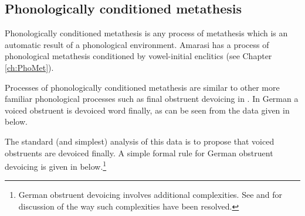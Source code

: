 \subsection{Phonologically conditioned metathesis}\label{sec:PhoMet}
Phonologically conditioned metathesis is any process of metathesis
which is an automatic result of a phonological environment.
Amarasi has a process of phonological metathesis conditioned
by vowel-initial enclitics (see Chapter \ref{ch:PhoMet}).

Processes of phonologically conditioned metathesis
are similar to other more familiar phonological processes
such as final obstruent devoicing in .
In German a voiced obstruent is devoiced word finally,
as can be seen from the data given in  below.

\begin{exe}
	\label{ex:GerFinObsDev}
\end{exe}

The standard (and simplest) analysis of this data is to propose
that voiced obstruents are devoiced finally.
A simple formal rule for German obstruent devoicing is given in  below.\footnote{
		German obstruent devoicing involves additional complexities.
		See \citep[200ff]{wi96} and \cite{br95} for discussion
		of the way such complexities have been resolved.}

